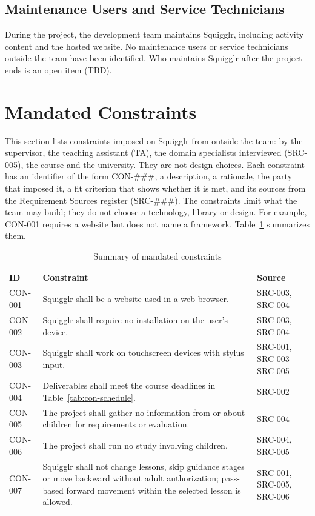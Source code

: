 \documentclass[12pt]{article}
\renewcommand{\_}{\textunderscore\allowbreak}%
\begin{document}
\subsection{Maintenance Users and Service Technicians}

During the project, the development team maintains Squigglr, including activity
content and the hosted website. No maintenance users or service technicians
outside the team have been identified. Who maintains Squigglr after the project
ends is an open item (TBD).

\section{Mandated Constraints}
\label{sec:constraints}
This section lists constraints imposed on Squigglr from outside the team: by the
supervisor, the teaching assistant (TA), the domain specialists interviewed
(SRC-005), the course and the university. They are not design choices. Each
constraint has an identifier of the form CON-\#\#\#, a description, a rationale,
the party that imposed it, a fit criterion that shows whether it is met, and its
sources from the Requirement Sources register (SRC-\#\#\#). The constraints
limit what the team may build; they do not choose a technology, library or
design. For example, CON-001 requires a website but does not name a framework.
Table~\ref{tab:constraints} summarizes them.

\begin{table}[H]
\centering
\small
\caption{Summary of mandated constraints}
\label{tab:constraints}
\begin{tabularx}{\textwidth}{@{}l>{\raggedright\arraybackslash}X>{\raggedright\arraybackslash}p{}@{}}
\toprule
\textbf{ID} & \textbf{Constraint} & \textbf{Source}\\
\midrule
CON-001 & Squigglr shall be a website used in a web browser. & SRC-003,
SRC-004\\
CON-002 & Squigglr shall require no installation on the user's device. &
SRC-003, SRC-004\\
CON-003 & Squigglr shall work on touchscreen devices with stylus input. &
SRC-001, SRC-003--SRC-005\\
CON-004 & Deliverables shall meet the course deadlines in
Table~\ref{tab:con-schedule}. & SRC-002\\
CON-005 & The project shall gather no information from or about children for
requirements or evaluation. & SRC-004\\
CON-006 & The project shall run no study involving children. & SRC-004,
SRC-005\\
CON-007 & Squigglr shall not change lessons, skip guidance stages or move
backward without adult authorization; pass-based forward movement within the
selected lesson is allowed. & SRC-001, SRC-005, SRC-006\\
\bottomrule
\end{tabularx}
\end{table}
\end{document}
